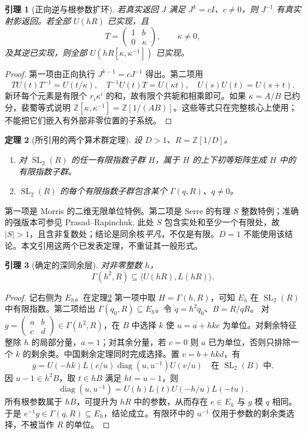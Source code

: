 \documentclass[11pt,a4paper]{article}
\newcommand{\ZZ}{\mathbb Z}
\newcommand{\SL}{\operatorname{SL}}
\newcommand{\diag}{\operatorname{diag}}
\newtheorem{theorem}{定理}[section]
\newtheorem{lemma}[theorem]{引理}
\theoremstyle{definition}
\numberwithin{equation}{section}
\begin{document}
\begin{lemma}[正向逆与根参数扩环]\label{lem:inverse-localize}
若真实返回 $J$ 满足 $J^k=cI$、$c\ne0$，则 $J^{-1}$ 有真实射影返回。若全部 $U(hR)$ 已实现，且
\[T=\begin{pmatrix}1&b\\0&\kappa\end{pmatrix},\qquad\kappa\ne0,\]
及其逆已实现，则全部 $U(hR[\kappa,\kappa^{-1}])$ 已实现。
\end{lemma}
\begin{proof}
第一项由正向执行 $J^{k-1}=cJ^{-1}$ 得出。第二项用
\[TU(t)T^{-1}=U(t/\kappa),\quad T^{-1}U(t)T=U(\kappa t),\quad U(s)U(t)=U(s+t).\]
新环每个元素是有限个 $r_i\kappa^i$ 的和，故有限个共轭和相乘即可。如果 $\kappa=A/B$ 已约分，裴蜀等式说明 $\ZZ[\kappa,\kappa^{-1}]=\ZZ[1/(AB)]$。这些等式只在完整核心上使用；不能把它们嵌入有外部非零位置的子系统。
\end{proof}

\begin{theorem}[所引用的两个算术群定理]\label{thm:external}
设 $D>1$、$R=\ZZ[1/D]$。
\begin{enumerate}
\item 对 $\SL_2(R)$ 的任一有限指数子群 $H$，属于 $H$ 的上下初等矩阵生成 $H$ 中的有限指数子群。
\item $\SL_2(R)$ 的每个有限指数子群包含某个 $\Gamma(q,R)$、$q\ne0$。
\end{enumerate}
\end{theorem}
第一项是 Morris\cite[Theorem 6.1(2)]{morris} 的二维无限单位特例。第二项是 Serre\cite{serre} 的有理 $S$ 整数特例；准确的强版本可参见 Prasad--Rapinchuk\cite[pp.308--309, Proposition 1 and Section 2.3]{prasad}. 此处 $S$ 包含实处和至少一个有限处，故 $|S|>1$，且含非复数处；结论是同余核\emph{平凡}，不仅是有限。$D=1$ 不能使用该结论。本文引用这两个已发表定理，不重证其一般形式。

\begin{lemma}[确定的深同余层]\label{lem:deep}
对非零整数 $h$，
\[\Gamma(h^2,R)\subseteq\langle U(hR),L(hR)\rangle.\]
\end{lemma}
\begin{proof}
记右侧为 $E_h$。在定理\ref{thm:external} 第一项中取 $H=\Gamma(h,R)$，可知 $E_h$ 在 $\SL_2(R)$ 中有限指数。第二项给出 $\Gamma(q_0,R)\subseteq E_h$。令 $q=h^2q_0$、$B=R/qR$。
对 $g=\left(\begin{smallmatrix}a&b\\c&d\end{smallmatrix}\right)\in\Gamma(h^2,R)$，在 $B$ 中选择 $k$ 使 $u=a+hkc$ 为单位。对剩余特征整除 $h$ 的局部分量，$a=1$；对其余分量，若 $c=0$ 则 $a$ 已为单位，否则只排除一个 $k$ 的剩余类。中国剩余定理同时完成选择。置 $v=b+hkd$，有
\[
 g=U(-hk)L(c/u)\diag(u,u^{-1})U(v/u)\quad\text{在 }\SL_2(B)\text{ 中}.
\]
因 $u-1\in h^2B$，取 $t\in hB$ 满足 $ht=u-1$，则
\[\diag(u,u^{-1})=U(h)L(t)U(-h/u)L(-tu).\]
所有根参数属于 $hB$，可提升为 $hR$ 中的参数，从而存在 $e\in E_h$ 与 $g$ 模 $q$ 相同。于是 $e^{-1}g\in\Gamma(q,R)\subseteq E_h$，结论成立。有限环中的 $u^{-1}$ 仅用于参数的剩余类选择，不被当作 $R$ 的单位。
\end{proof}
\end{document}

